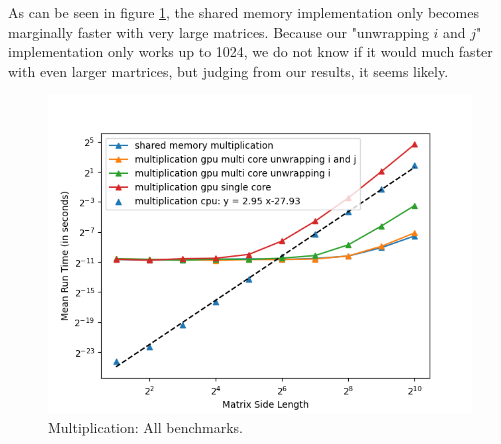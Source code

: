 As can be seen in figure \ref{fig:mul_all_bench}, the shared memory implementation only becomes marginally faster with very large matrices. Because our "unwrapping $i$ and $j$" implementation only works up to 1024, we do not know if it would much faster with even larger martrices, but judging from our results, it seems likely.

\begin{figure}[h]
  \includegraphics[width=\textwidth]{SavedBenchmarksAndDiagrams/Machine 2/Multiplication/GPU Shared 1.png}
  \centering
  \caption{Multiplication: All benchmarks.}
  \label{fig:mul_all_bench}
\end{figure}


